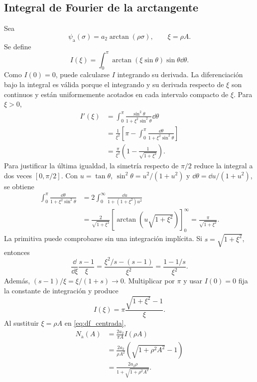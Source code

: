 \fi
\ifnum{}\relax
\subsection{Integral de Fourier de la arctangente}
\label{app:df_arctan}

Sea
\[
\psi_{\mathrm a}(\sigma)=a_2\arctan(\rho\sigma),
\qquad
\xi=\rho A.
\]
Se define
\[
I(\xi)=
\int_0^\pi\arctan(\xi\sin\theta)\sin\theta\dd\theta.
\]
Como \(I(0)=0\), puede calcularse \(I\) integrando su derivada.
La diferenciación bajo la integral es válida porque el integrando y su
derivada respecto de \(\xi\) son continuos y están uniformemente
acotados en cada intervalo compacto de \(\xi\). Para \(\xi>0\),
\begin{align}
I'(\xi)
&=\int_0^\pi
\frac{\sin^2\theta}{1+\xi^2\sin^2\theta}\dd\theta\nonumber\\
&=\frac1{\xi^2}
\left[
\pi-\int_0^\pi
\frac{\dd\theta}{1+\xi^2\sin^2\theta}
\right]\nonumber\\
&=\frac{\pi}{\xi^2}
\left(1-\frac1{\sqrt{1+\xi^2}}\right).
\label{eq:derivada_integral_arctan}
\end{align}
Para justificar la última igualdad, la simetría respecto de \(\pi/2\)
reduce la integral a dos veces \([0,\pi/2]\). Con
\(u=\tan\theta\), \(\sin^2\theta=u^2/(1+u^2)\) y
\(\dd\theta=\dd u/(1+u^2)\), se obtiene
\begin{align*}
 \int_0^\pi\frac{\dd\theta}{1+\xi^2\sin^2\theta}
 &=2\int_0^\infty\frac{\dd u}{1+(1+\xi^2)u^2}\\
 &=\frac{2}{\sqrt{1+\xi^2}}
 \left[\arctan\!\left(u\sqrt{1+\xi^2}\right)\right]_0^\infty
 =\frac{\pi}{\sqrt{1+\xi^2}}.
\end{align*}
La primitiva puede comprobarse sin una integración implícita. Si
\(s=\sqrt{1+\xi^2}\), entonces
\[
 \frac{\dd}{\dd\xi}\frac{s-1}{\xi}
 =\frac{\xi^2/s-(s-1)}{\xi^2}
 =\frac{1-1/s}{\xi^2}.
\]
Además, \((s-1)/\xi=\xi/(1+s)\to0\). Multiplicar por \(\pi\)
y usar \(I(0)=0\) fija la constante de integración y produce
\begin{equation}
I(\xi)
=\pi\frac{\sqrt{1+\xi^2}-1}{\xi}.
\label{eq:integral_arctan}
\end{equation}
Al sustituir \(\xi=\rho A\) en
\cref{eq:df_centrada},
\begin{align}
N_{\mathrm a}(A)
&=\frac{2a_2}{\pi A}I(\rho A)\nonumber\\
&=\frac{2a_2}{\rho A^2}
\left(\sqrt{1+\rho^2A^2}-1\right)\nonumber\\
&=\frac{2a_2\rho}
{1+\sqrt{1+\rho^2A^2}}.
\label{eq:df_arctan_derivada}
\end{align}

